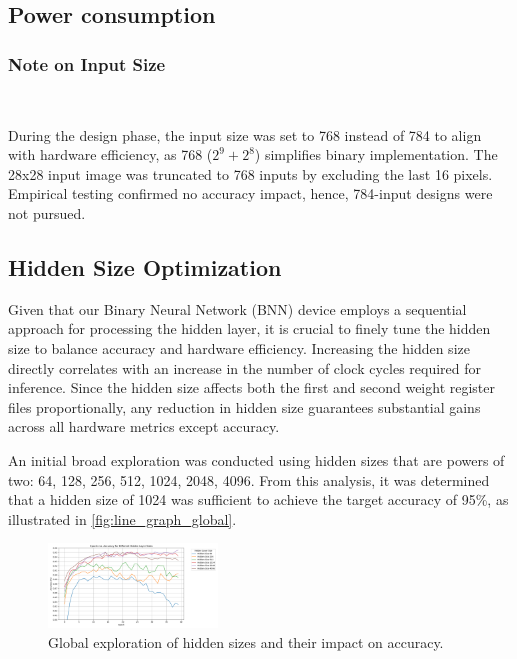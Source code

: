 \documentclass[conference]{IEEEtran}
\newcounter{todocount}
\newcommand{\todo}[1]{
  \stepcounter{todocount}
}
\begin{document}
\subsection{Power consumption}
\todo{section calculation of power}
\todo{number of cycles = hidden size + delay from xnor popcount}
\todo{power from number of cycles and watts}

\subsubsection{Note on Input Size}
\hfill\\
\label{ref:why_768}

During the design phase, the input size was set to 768 instead of 784 to align with hardware efficiency, as 768 (\(2^9 + 2^8\)) simplifies binary implementation. The 28x28 input image was truncated to 768 inputs by excluding the last 16 pixels. Empirical testing confirmed no accuracy impact, hence, 784-input designs were not pursued.


\subsection{Hidden Size Optimization}
\label{ref:hidden_size_optimization}

Given that our Binary Neural Network (BNN) device employs a sequential approach for processing the hidden layer, it is crucial to finely tune the hidden size to balance accuracy and hardware efficiency. Increasing the hidden size directly correlates with an increase in the number of clock cycles required for inference.
Since the hidden size affects both the first and second weight register files proportionally, any reduction in hidden size guarantees substantial gains across all hardware metrics except accuracy.

An initial broad exploration was conducted using hidden sizes that are powers of two: 64, 128, 256, 512, 1024, 2048, 4096. From this analysis, it was determined that a hidden size of 1024 was sufficient to achieve the target accuracy of 95\%, as illustrated in \autoref{fig:line_graph_global}.

\begin{figure}[h]
    \centering
    \includegraphics[width=0.4\textwidth]{Global_exploration_hidden_sizes.png}
    \caption{Global exploration of hidden sizes and their impact on accuracy.}
    \label{fig:line_graph_global}
\end{figure}
\end{document}
